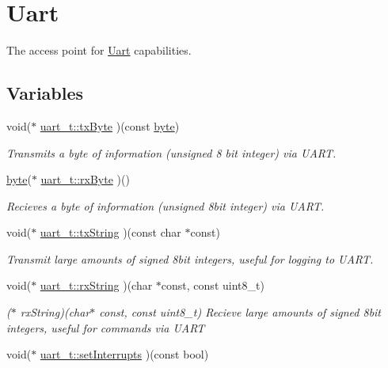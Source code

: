\hypertarget{a00018}{\section{Uart}
\label{a00018}
}


The access point for \hyperlink{a00009}{Uart} capabilities.  


\subsection*{Variables}
\begin{DoxyCompactItemize}
\item 
void($\ast$ \hyperlink{a00018_ga2ee9c992930c7a52010c7a6abf0d316c}{uart\-\_\-t\-::tx\-Byte} )(const \hyperlink{a00011_a82b52bf2b45e214a8f2100ebfdf1aee4}{byte})
\begin{DoxyCompactList}\small\item\em Transmits a byte of information (unsigned 8 bit integer) via U\-A\-R\-T. \end{DoxyCompactList}\item 
\hyperlink{a00011_a82b52bf2b45e214a8f2100ebfdf1aee4}{byte}($\ast$ \hyperlink{a00018_ga114e9fef74ba99e9a09f89ed6d12da17}{uart\-\_\-t\-::rx\-Byte} )()
\begin{DoxyCompactList}\small\item\em Recieves a byte of information (unsigned 8bit integer) via U\-A\-R\-T. \end{DoxyCompactList}\item 
void($\ast$ \hyperlink{a00018_gaced0693da5d9c07328e6a325d6d7edee}{uart\-\_\-t\-::tx\-String} )(const char $\ast$const)
\begin{DoxyCompactList}\small\item\em Transmit large amounts of signed 8bit integers, useful for logging to U\-A\-R\-T. \end{DoxyCompactList}\item 
void($\ast$ \hyperlink{a00018_gafb6340cda56aa27bc772e4ceec334c82}{uart\-\_\-t\-::rx\-String} )(char $\ast$const, const uint8\-\_\-t)
\begin{DoxyCompactList}\small\item\em ($\ast$ rx\-String)(char$\ast$ const, const uint8\-\_\-t) Recieve large amounts of signed 8bit integers, useful for commands via U\-A\-R\-T \end{DoxyCompactList}\item 
void($\ast$ \hyperlink{a00018_gac87718fed4c53bd319218fe925e52d14}{uart\-\_\-t\-::set\-Interrupts} )(const bool)

\end{DoxyCompactItemize}
